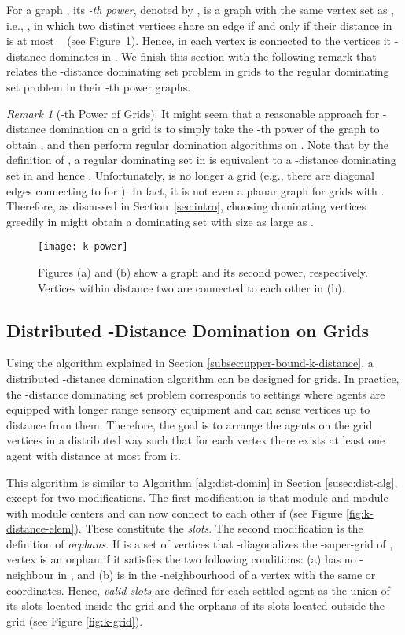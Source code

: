 \documentclass[letterpaper, 10pt, conference]{ieeeconf}
\theoremstyle{definition}
\theoremstyle{remark}
\newtheorem{remark}[theorem]{Remark}
\begin{document}
For a graph , its \emph{-th power}, denoted by , is a graph with the same vertex set as , i.e., , in which two distinct vertices share an edge if and only if their distance in  is at most ~\cite{BM'08} (see Figure~\ref{fig:k-power}). Hence, in  each vertex is connected to the vertices it -distance dominates in . We finish this section with the following remark that relates the -distance dominating set problem in grids to the regular dominating set problem in their -th power graphs.

\begin{remark}[-th Power of Grids]
\label{rem:k-power}
It might seem that a reasonable approach for -distance domination on a grid  is to simply take the -th power of the graph to obtain , and then perform regular domination algorithms on . Note that by the definition of , a regular dominating set in  is equivalent to a -distance dominating set in  and hence . Unfortunately,  is no longer a grid (e.g., there are diagonal edges connecting  to  for ). In fact, it is not even a planar graph for  grids with . Therefore, as discussed in Section~\ref{sec:intro}, choosing dominating vertices greedily in  might obtain a dominating set with size as large as .
\end{remark}

\begin{figure}[t]
\texttt{[image: k-power]}
\caption{Figures (a) and (b) show a  graph and its second power, respectively. Vertices within distance two are connected to each other in (b).}
\label{fig:k-power}
\end{figure}

\subsection{Distributed -Distance Domination on Grids}
\label{subsection:k-distance-dist}
Using the algorithm explained in Section \ref{subsec:upper-bound-k-distance}, a distributed -distance domination algorithm can be designed for grids. In practice, the -distance dominating set problem corresponds to settings where agents are equipped with longer range sensory equipment and can sense vertices up to distance  from them.
Therefore, the goal is to arrange the agents on the grid vertices in a distributed way such that for each vertex there exists at least one agent with distance at most  from it.


This algorithm is similar to Algorithm \ref{alg:dist-domin} in Section \ref{susec:dist-alg}, except for two modifications. The first modification is that module  and module  with module centers  and  can now connect to each other if  (see Figure \ref{fig:k-distance-elem}). These constitute the \emph{slots}. The second modification is the definition of \emph{orphans}. If  is a set of vertices that -diagonalizes the -super-grid of , vertex  is an orphan if it satisfies the two following conditions: (a)  has no -neighbour in , and (b)  is in the -neighbourhood of a vertex  with the same  or  coordinates. Hence, \emph{valid slots} are defined for each settled agent as the union of its slots located inside the grid and the orphans of its slots located outside the grid (see Figure \ref{fig:k-grid}).
\end{document}
